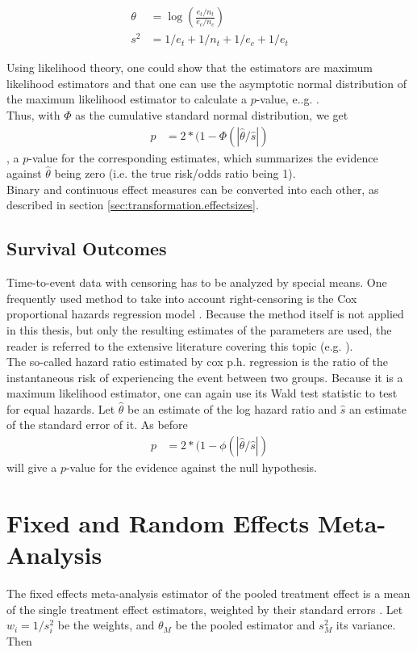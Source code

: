 \documentclass[11pt,a4paper,twoside]{book}\usepackage[]{graphicx}\usepackage[]{color}
\begin{document}
\begin{align}
\theta &= \log(\frac{e_t/n_t}{e_c/n_c}) \label{eq:risk.ratio} \\
s^2 &= 1/e_t + 1/n_t + 1/e_c + 1/e_t \label{eq:risk.ratio.variance}
\end{align}

Using likelihood theory, one could show that the estimators are maximum likelihood estimators and that one can use the asymptotic normal distribution of the maximum likelihood estimator to calculate a $p$-value, e..g. \cite[98]{held2014}. \\
Thus, with $\Phi$ as the cumulative standard normal distribution, we get
\begin{align}
p &= 2*(1-\Phi(|\hat{\theta}/\hat{s}|) \nonumber
\end{align}
, a $p$-value for the corresponding estimates, which summarizes the evidence against $\hat{\theta}$ being zero (i.e. the true risk/odds ratio being 1). \\
Binary and continuous effect measures can be converted into each other, as described in section \ref{sec:transformation.effectsizes}.

\subsection{Survival Outcomes}
Time-to-event data with censoring has to be analyzed by special means. One frequently used method to take into account right-censoring is the Cox proportional hazards regression model \citep{Cox}. Because the method itself is not applied in this thesis, but only the resulting estimates of the parameters are used, the reader is referred to the extensive literature covering this topic (e.g. \citet{Surv}). \\
The so-called hazard ratio estimated by cox p.h. regression is the ratio of the instantaneous risk of experiencing the event between two groups. Because it is a maximum likelihood estimator, one can again use its Wald test statistic to test for equal hazards. Let $\hat{\theta}$ be an estimate of the log hazard ratio and $\hat{s}$ an estimate of the standard error of it. As before
\begin{align}
p &= 2*(1-\phi(|\hat{\theta}/\hat{s}|) \nonumber
\end{align}
will give a $p$-value for the evidence against the null hypothesis.



\section{Fixed and Random Effects Meta-Analysis} \label{sec:meta.analysis}
The fixed effects meta-analysis estimator of the pooled treatment effect is a mean of the single treatment effect estimators, weighted by their standard errors \citep{fixed.effects.rosenthal}. Let $w_i = 1/s_i^2$ be the weights, and $\theta_M$ be the pooled estimator and $s_M^2$ its variance. Then 
\end{document}

